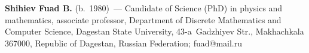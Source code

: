 \vspace*{6pt}

\noindent
\textbf{Shihiev Fuad B.} (b.\ 1980)~--- Candidate of Science (PhD) in physics and 
mathematics, associate professor, Department of Discrete Mathematics and Computer Science, 
Dagestan State University, 43-a~Gadzhiyev Str., Makhachkala 367000, Republic of Dagestan, 
Russian Federation; \mbox{fuad@mail.ru}

\label{end\stat}

\renewcommand{\bibname}{\protect\rm Литература} 